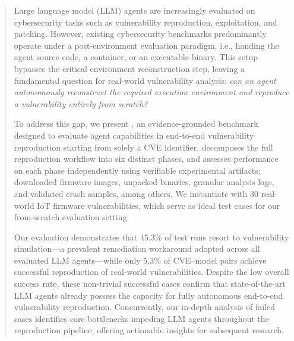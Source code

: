 
\begin{abstract}
    Large language model (LLM) agents are increasingly evaluated on cybersecurity tasks such as vulnerability reproduction, exploitation, and patching. However, existing cybersecurity benchmarks predominantly operate under a post-environment evaluation paradigm, i.e., handing the agent source code, a container, or an executable binary. This setup bypasses the critical environment reconstruction step, leaving a fundamental question for real-world vulnerability analysis: \emph{can an agent autonomously reconstruct the required execution environment and reproduce a vulnerability entirely from scratch?}
     
    To address this gap, we present \sys, an evidence-grounded benchmark designed to evaluate agent capabilities in end-to-end vulnerability reproduction starting from solely a CVE identifier. \sys{} decomposes the full reproduction workflow into six distinct phases, and assesses performance on each phase independently using verifiable experimental artifacts: downloaded firmware images, unpacked binaries, granular analysis logs, and validated crash samples, among others. We instantiate \sys{} with 30 real-world IoT firmware vulnerabilities, which serve as ideal test cases for our from-scratch evaluation setting.

    Our evaluation demonstrates that 45.3\% of test runs resort to vulnerability simulation—a prevalent remediation workaround adopted across all evaluated LLM agents—while only 5.3\% of CVE--model pairs achieve successful reproduction of real-world vulnerabilities. Despite the low overall success rate, these non-trivial successful cases confirm that state-of-the-art LLM agents already possess the capacity for fully autonomous end-to-end vulnerability reproduction. Concurrently, our in-depth analysis of failed cases identifies core bottlenecks impeding LLM agents throughout the reproduction pipeline, offering actionable insights for subsequent research.
\end{abstract}